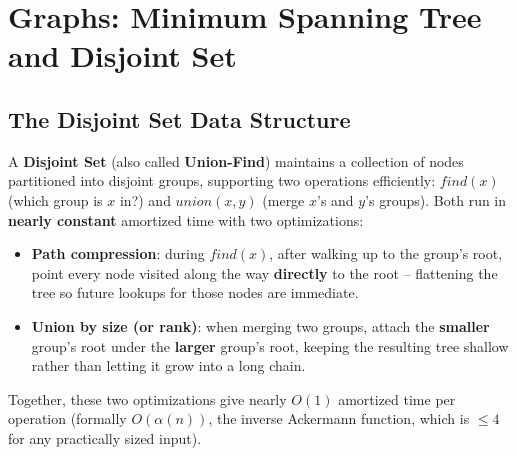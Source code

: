 \chapter{Graphs: Minimum Spanning Tree and Disjoint Set}

\section{The Disjoint Set Data Structure}
\label{sec:graph-disjoint-set}

A \textbf{Disjoint Set} (also called \textbf{Union-Find}) maintains a
collection of nodes partitioned into disjoint groups, supporting two
operations efficiently: $\textit{find}(x)$ (which group is $x$ in?)
and $\textit{union}(x,y)$ (merge $x$'s and $y$'s groups). Both run in
\textbf{nearly constant} amortized time with two optimizations:

\begin{ideabox}
\begin{itemize}
  \item \textbf{Path compression}: during $\textit{find}(x)$, after
        walking up to the group's root, point every node visited along
        the way \textbf{directly} to the root -- flattening the tree
        so future lookups for those nodes are immediate.
  \item \textbf{Union by size (or rank)}: when merging two groups,
        attach the \textbf{smaller} group's root under the
        \textbf{larger} group's root, keeping the resulting tree
        shallow rather than letting it grow into a long chain.
\end{itemize}
Together, these two optimizations give nearly $O(1)$ amortized time
per operation (formally $O(\alpha(n))$, the inverse Ackermann
function, which is $\le 4$ for any practically sized input).
\end{ideabox}

